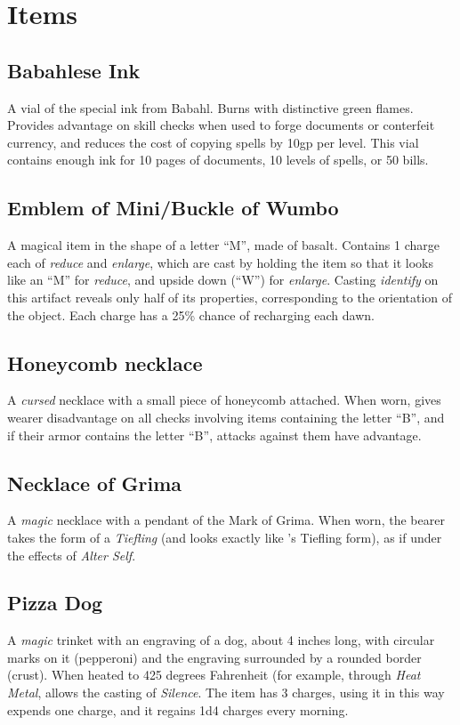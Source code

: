 \section{Items}
\subsection{Babahlese Ink}
\label{items:ink}
A vial of the special ink from Babahl. Burns with distinctive green flames. Provides advantage on skill checks when used to forge documents or conterfeit currency, and reduces the cost of copying spells by 10gp per level. This vial contains enough ink for 10 pages of documents, 10 levels of spells, or 50 bills.

\subsection{Emblem of Mini/Buckle of Wumbo}
\label{items:wumbo}
A magical item in the shape of a letter ``M'', made of basalt. Contains 1 charge each of \textit{reduce} and \textit{enlarge}, which are cast by holding the item so that it looks like an ``M'' for \textit{reduce}, and upside down (``W'') for \textit{enlarge}. Casting \textit{identify} on this artifact reveals only half of its properties, corresponding to the orientation of the object. Each charge has a 25\% chance of recharging each dawn.

\subsection{Honeycomb necklace}
\label{items:honeycomb}
A \textit{cursed} necklace with a small piece of honeycomb attached. When worn, gives wearer disadvantage on all checks involving items containing the letter ``B'', and if their armor contains the letter ``B'', attacks against them have advantage. 

\subsection{Necklace of Grima}
\label{items:grimanecklace}
A \textit{magic} necklace with a pendant of the Mark of Grima. When worn, the bearer takes the form of a \textit{Tiefling} (and looks exactly like 's Tiefling form), as if under the effects of \textit{Alter Self}.

\subsection{Pizza Dog}
\label{items:pizzadog}
A \textit{magic} trinket with an engraving of a dog, about 4 inches long, with circular marks on it (pepperoni) and the engraving surrounded by a rounded border (crust). When heated to 425 degrees Fahrenheit (for example, through \textit{Heat Metal}, allows the casting of \textit{Silence}. The item has 3 charges, using it in this way expends one charge, and it regains 1d4 charges every morning.


